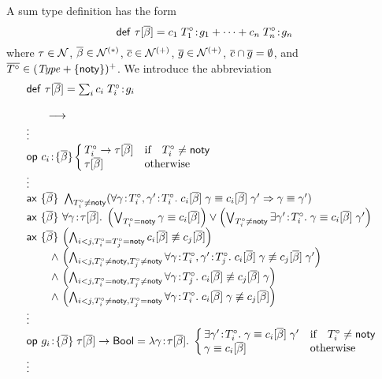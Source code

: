 A sum type definition has the form
\[
\mathsf{def}\ \tau[\overline{\beta}]=c_1\;T^\circ_1\!:\!g_1+\cdots+c_n\;T^\circ_n\!:\!g_n
\]
where $\tau\in\mathcal{N}$, $\overline{\beta}\in\mathcal{N}^{(\ast)}$, $\overline{c}\in\mathcal{N}^{(+)}$,
$\overline{g}\in\mathcal{N}^{(+)}$, $\overline{c}\cap\overline{g}=\emptyset$, and
$\overline{T^\circ}\in(\mathit{Type}+\{\mathsf{noty}\})^+$.  We introduce the abbreviation
\[
\abbvert
 {\tdefsum{\tnam}{\tvarS}{\tsumO}\\}
 {\vdots\\
  \odec{\cnam_i}{\tvarS}
       {\!\!\cond{\optyp_i\neq\notyp}
               {\tarr{\optyp_i}{\tinst{\tnam}{\tvarS}}}
               {\tinst{\tnam}{\tvarS}}}
  \\\vdots\\
  \ax{\tvarS}{\conjI{\optyp_i\neq\notyp}
                    {(\faS{\seqII{\bnd{\varfx}{\optyp_i}}
                                 {\bnd{\varfx'}{\optyp_i}}}
                          {\impl{\eq{\app{\op{\cnam_i}{\tvarS}}{\varfx}}
                                    {\app{\op{\cnam_i}{\tvarS}}{\varfx'}}}
                                {\eq{\varfx}{\varfx'}}})}}
  \\
  \ax{\tvarS}{\fa{\varfx}{\tinst{\tnam}{\tvarS}}
                 {\disj{\left(
                        \disjI{\optyp_i=\notyp}
                              {\eq{\varfx}{\op{\cnam_i}{\tvarS}}}
                        \right)}
                       {\left(
                        \disjI{\optyp_i\neq\notyp}
                              {\ex{\varfx'}{\optyp_i}
                                  {\eq{\varfx}
                                      {\app{\op{\cnam_i}{\tvarS}}{\varfx'}}}}
                        \right)}}}
  \\
  \axLconjIV{\tvarS}
            {\left(
             \conjI{i<j,\optyp_i=\optyp_j=\notyp}
                   {\neeq{\op{\cnam_i}{\tvarS}}{\op{\cnam_j}{\tvarS}}}
             \right)}
            {\left(
             \conjI{i<j,\optyp_i\neq\notyp,\optyp_j\neq\notyp}
                   {\faS{\seqII{\bnd{\varfx}{\optyp_i}}
                               {\bnd{\varfx'}{\optyp_j}}}
                        {\neeq{\app{\op{\cnam_i}{\tvarS}}{\varfx}}
                              {\app{\op{\cnam_j}{\tvarS}}{\varfx'}}}}
             \right)}
            {\left(
             \conjI{i<j,\optyp_i=\notyp,\optyp_j\neq\notyp}
                   {\fa{\varfx}{\optyp_j}
                       {\neeq{\op{\cnam_i}{\tvarS}}
                             {\app{\op{\cnam_j}{\tvarS}}{\varfx}}}}
             \right)}
            {\left(
             \conjI{i<j,\optyp_i\neq\notyp,\optyp_j=\notyp}
                   {\fa{\varfx}{\optyp_i}
                       {\neeq{\app{\op{\cnam_i}{\tvarS}}{\varfx}}
                             {\op{\cnam_j}{\tvarS}}}}
             \right)}
  \\\vdots\\
  \odefI{\recog_i}{\tvarS}{\tarr{\tinst{\tnam}{\tvarS}}{\bool}}
        {\abs{\varfx}{\tinst{\tnam}{\tvarS}}
             {\cond{\optyp_i\neq\notyp}
                   {\ex{\varfx'}{\optyp_i}
                       {\eq{\varfx}{\app{\op{\cnam_i}{\tvarS}}{\varfx'}}}}
                   {\eq{\varfx}{\op{\cnam_i}{\tvarS}}}}}
  \\\vdots}
\]

